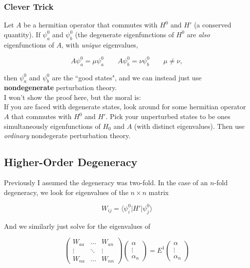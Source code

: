 \documentclass[svgnames]{article}
\begin{document}
\subsubsection{Clever Trick} 

Let $A$ be a hermitian operator that commutes with $H^0$ and $H'$ (a conserved quantity).
If $\psi_a^{0}$ and $\psi_b^{0}$ (the degenerate eigenfunctions of $H^{0}$ are \textit{also}
eigenfunctions of $A$, with \textit{unique} eigenvalues, 

\[
A\psi_a^{0} = \mu \psi_a^{0} \qquad A\psi_b^{0} = \nu \psi_b^{0} \qquad \mu \neq \nu,
\] \vspace{3px}

then $\psi_a^{0}$ and $\psi_b^{0}$ are the ``good states", and we can instead just use 
\textbf{nondegenerate} perturbation theory. \\

I won't show the proof here, but the moral is: \\ 

If you are faced with degenerate states, look around for some hermitian operator $A$ that commutes
with $H^{0}$ and $H'$. Pick your unperturbed states to be ones simultaneously eigenfunctions of 
$H_0$ and $A$ (with distinct eigenvalues). Then use \textit{ordinary} nondegerate perturbation theory. 

\subsection{Higher-Order Degeneracy} 

Previously I assumed the degeneracy was two-fold. In the case of an $n$-fold degeneracy, we look for eigenvalues 
of the $n\times n$ matrix 

\[
    W_{ij} = \Big\langle \psi_i^{0} | H' | \psi_j^{0}\Big\rangle
\] \vspace{3px}

And we similarly just solve for the eigenvalues of 

\[
\begin{pmatrix}
    W_{aa} & \hdots & W_{an} \\ 
    \vdots & \ddots & \vdots \\
    W_{na} & \hdots & W_{nn}
\end{pmatrix} \begin{pmatrix}
    \alpha \\ \vdots \\ \alpha_n
\end{pmatrix}  = E^1 \begin{pmatrix}
    \alpha \\ \vdots \\ \alpha_n 
\end{pmatrix} 
\] \vspace{3px}
\end{document}
